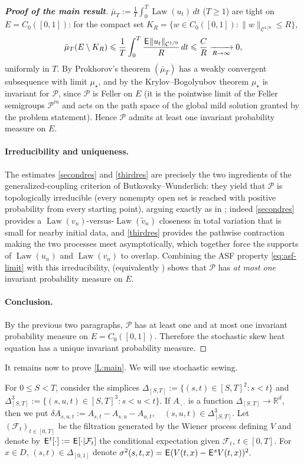 \documentclass[12pt]{article}
\theoremstyle{definition}
\DeclareMathOperator{\1}{\mathbbm{1}}%
\DeclareMathOperator{\law}{Law}%
\def\E{\hskip.15ex\mathsf{E}\hskip.10ex}
\renewcommand{\ge}{\geqslant}
\renewcommand{\le}{\leqslant}
\newcommand{\wt}{\widetilde}
\newcommand{\C}{\mathcal{C}}
\newcommand{\F}{\mathcal{F}}
\newcommand{\PP}{\mathcal{P}}
\newcommand{\R}{\mathbb{R}}
\begin{document}
\begin{proof}[\textbf{Proof of the main result}]
$\bar\mu_T:=\frac1T\int_0^T \law(u_t)\,dt$ ($T\ge1$) are tight on $E=C_0([0,1])$: for the
compact set $K_R=\{w\in C_0([0,1]):\|w\|_{\C^{1/9}}\le R\}$,
\[
\bar\mu_T(E\setminus K_R)\le \frac1T\int_0^T\frac{\E\|u_t\|_{\C^{1/9}}}{R}\,dt\le\frac{C}{R}\xrightarrow[R\to\infty]{}0,
\]
uniformly in $T$. By Prokhorov's theorem $(\bar\mu_T)$ has a weakly convergent subsequence with
limit $\mu_\star$, and by the Krylov--Bogolyubov theorem $\mu_\star$ is invariant for $\PP$,
since $\PP$ is Feller on $E$ (it is the pointwise limit of the Feller semigroups $\PP^m$ and
acts on the path space of the global mild solution granted by the problem statement). Hence
$\PP$ admits at least one invariant probability measure on $E$.

\paragraph{Irreducibility and uniqueness.}
The estimates \eqref{secondres} and \eqref{thirdres} are precisely the two ingredients of the
generalized-coupling criterion of Butkovsky--Wunderlich: they yield that $\PP$ is topologically
irreducible (every nonempty open set is reached with positive probability from every starting
point), arguing exactly as in \cite[proof of Theorem~2.7]{BW20}; indeed \eqref{secondres}
provides a $\law(v_n)$-versus-$\law(\wt v_n)$ closeness in total variation that is small for
nearby initial data, and \eqref{thirdres} provides the pathwise contraction making the two
processes meet asymptotically, which together force the supports of $\law(u_n)$ and $\law(v_n)$
to overlap. Combining the ASF property \eqref{eq:asf-limit} with this irreducibility,
\cite[Corollary~3.17]{HM06} (equivalently \cite[Theorem~2.8]{BW20}) shows that $\PP$ has
\emph{at most one} invariant probability measure on $E$.

\paragraph{Conclusion.}
By the previous two paragraphs, $\PP$ has at least one and at most one invariant probability
measure on $E=C_0([0,1])$. Therefore the stochastic skew heat equation has a unique invariant
probability measure.
\end{proof}

It remains now to prove \cref{L:main}. We will use stochastic sewing.

For $0 \le S < T$, consider the simplices 
$\Delta_{[S,T]}:=\{(s,t)\in[S,T]^2\colon s< t\}$ and $\Delta^3_{[S,T]}:=\{(s,u,t)\in[S,T]^3\colon s< u< t\}$. 
If $A_{\cdot,\cdot}$ is a function $\Delta_{[S,T]}\to\R^d$, then we put 
$\delta A_{s,u,t}:= A_{s,t}-A_{s,u}-A_{u,t},\quad  (s,u,t)\in\Delta^3_{[S,T]}$. 
Let $(\F_t)_{t\in[0,T]}$ be the filtration generated by the Wiener
process defining $V$ and denote by  $\E^t[\cdot]:=\E[\cdot|\F_t]$ the conditional expectation given $\F_t$, $t\in[0,T]$. For $x\in D$, $(s,t)\in\Delta_{[0,1]}$ denote
$
\sigma^2(s,t,x)=\E (V(t,x)-\E^s V(t,x))^2.
$
\end{document}
